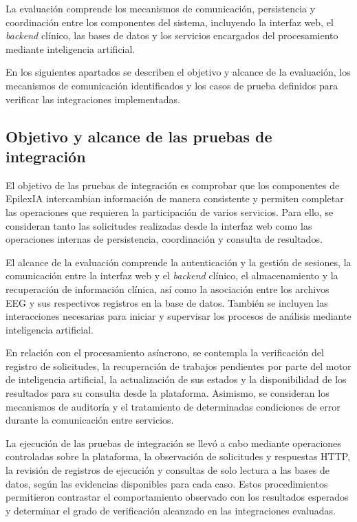 La evaluación comprende los mecanismos de comunicación, persistencia y coordinación entre los componentes del sistema, incluyendo la interfaz web, el \textit{backend} clínico, las bases de datos y los servicios encargados del procesamiento mediante inteligencia artificial.

En los siguientes apartados se describen el objetivo y alcance de la evaluación, los mecanismos de comunicación identificados y los casos de prueba definidos para verificar las integraciones implementadas.


\subsection{Objetivo y alcance de las pruebas de integración}

\label{subsec:objetivo_pruebas_integracion}

El objetivo de las pruebas de integración es comprobar que los componentes de EpilexIA intercambian información de manera consistente y permiten completar las operaciones que requieren la participación de varios servicios. Para ello, se consideran tanto las solicitudes realizadas desde la interfaz web como las operaciones internas de persistencia, coordinación y consulta de resultados.

El alcance de la evaluación comprende la autenticación y la gestión de sesiones, la comunicación entre la interfaz web y el \textit{backend} clínico, el almacenamiento y la recuperación de información clínica, así como la asociación entre los archivos EEG y sus respectivos registros en la base de datos. También se incluyen las interacciones necesarias para iniciar y supervisar los procesos de análisis mediante inteligencia artificial.

En relación con el procesamiento asíncrono, se contempla la verificación del registro de solicitudes, la recuperación de trabajos pendientes por parte del motor de inteligencia artificial, la actualización de sus estados y la disponibilidad de los resultados para su consulta desde la plataforma. Asimismo, se consideran los mecanismos de auditoría y el tratamiento de determinadas condiciones de error durante la comunicación entre servicios.


La ejecución de las pruebas de integración se llevó a cabo mediante operaciones controladas sobre la plataforma, la observación de solicitudes y respuestas HTTP, la revisión de registros de ejecución y consultas de solo lectura a las bases de datos, según las evidencias disponibles para cada caso. Estos procedimientos permitieron contrastar el comportamiento observado con los resultados esperados y determinar el grado de verificación alcanzado en las integraciones evaluadas.


